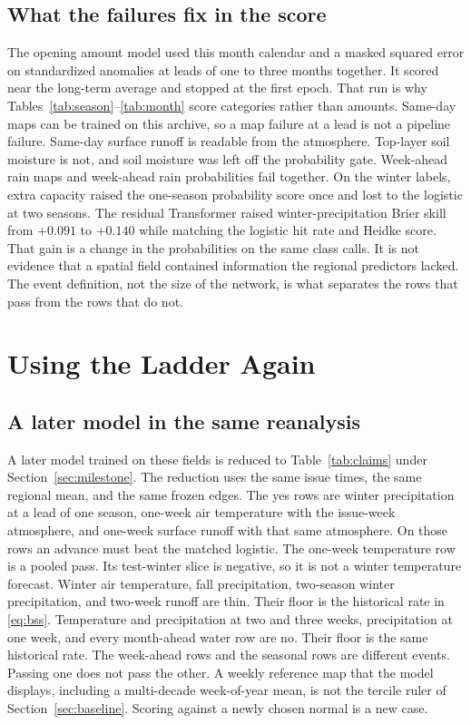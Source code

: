 \documentclass{ametsocV6.2}
\begin{document}
\subsection{What the failures fix in the score}
\label{sec:failures}

The opening amount model used this month calendar and a masked squared error on standardized anomalies at leads of one to three months together.
It scored near the long-term average and stopped at the first epoch.
That run is why Tables~\ref{tab:season}--\ref{tab:month} score categories rather than amounts.
Same-day maps can be trained on this archive, so a map failure at a lead is not a pipeline failure.
Same-day surface runoff is readable from the atmosphere.
Top-layer soil moisture is not, and soil moisture was left off the probability gate.
Week-ahead rain maps and week-ahead rain probabilities fail together.
On the winter labels, extra capacity raised the one-season probability score once and lost to the logistic at two seasons.
The residual Transformer raised winter-precipitation Brier skill from $+0.091$ to $+0.140$ while matching the logistic hit rate and Heidke score.
That gain is a change in the probabilities on the same class calls.
It is not evidence that a spatial field contained information the regional predictors lacked.
The event definition, not the size of the network, is what separates the rows that pass from the rows that do not.

\section{Using the Ladder Again}
\label{sec:again}

\subsection{A later model in the same reanalysis}
\label{sec:later}

A later model trained on these fields is reduced to Table~\ref{tab:claims} under Section~\ref{sec:milestone}.
The reduction uses the same issue times, the same regional mean, and the same frozen edges.
The yes rows are winter precipitation at a lead of one season, one-week air temperature with the issue-week atmosphere, and one-week surface runoff with that same atmosphere.
On those rows an advance must beat the matched logistic.
The one-week temperature row is a pooled pass.
Its test-winter slice is negative, so it is not a winter temperature forecast.
Winter air temperature, fall precipitation, two-season winter precipitation, and two-week runoff are thin.
Their floor is the historical rate in \eqref{eq:bss}.
Temperature and precipitation at two and three weeks, precipitation at one week, and every month-ahead water row are no.
Their floor is the same historical rate.
The week-ahead rows and the seasonal rows are different events.
Passing one does not pass the other.
A weekly reference map that the model displays, including a multi-decade week-of-year mean, is not the tercile ruler of Section~\ref{sec:baseline}.
Scoring against a newly chosen normal is a new case.
\end{document}

